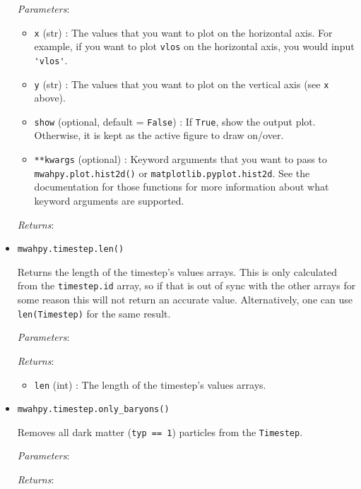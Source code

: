 \documentclass{article}
\begin{document}
\begin{itemize}
\textit{Parameters}: \begin{itemize}

\item \verb!x! (str) : The values that you want to plot on the horizontal axis. For example, if you want to plot \verb!vlos! on the horizontal axis, you would input \verb!'vlos'!.

\item \verb!y! (str) : The values that you want to plot on the vertical axis (see \verb!x! above).

\item \verb!show! (optional, default = \verb!False!) : If \verb!True!, show the output plot. Otherwise, it is kept as the active figure to draw on/over. 

\item \verb!**kwargs! (optional) : Keyword arguments that you want to pass to \verb!mwahpy.plot.hist2d()! or \verb!matplotlib.pyplot.hist2d!. See the documentation for those functions for more information about what keyword arguments are supported.

\end{itemize}

\textit{Returns}: 



\item \verb!mwahpy.timestep.len()!

Returns the length of the timestep's values arrays. This is only calculated from the \verb!timestep.id! array, so if that is out of sync with the other arrays for some reason this will not return an accurate value. Alternatively, one can use \verb!len(Timestep)! for the same result.

\textit{Parameters}: 

\textit{Returns}: \begin{itemize} 

\item \verb!len! (int) : The length of the timestep's values arrays.

\end{itemize}



\item \verb!mwahpy.timestep.only_baryons()!

Removes all dark matter (\verb!typ == 1!) particles from the \verb!Timestep!.

\textit{Parameters}: 

\textit{Returns}: 




\end{itemize}
\end{document}
